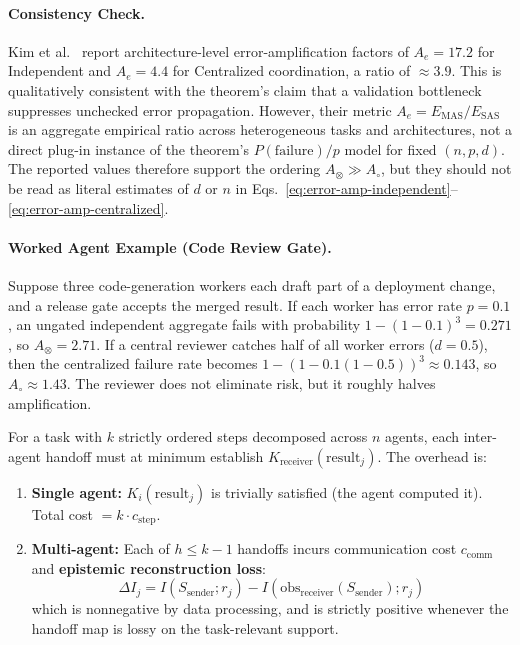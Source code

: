 \paragraph{Consistency Check.} Kim et al.~\cite{kim2025scaling} report architecture-level error-amplification factors of $A_e = 17.2$ for Independent and $A_e = 4.4$ for Centralized coordination, a ratio of $\approx 3.9$. This is qualitatively consistent with the theorem's claim that a validation bottleneck suppresses unchecked error propagation. However, their metric $A_e = E_{\mathrm{MAS}}/E_{\mathrm{SAS}}$ is an aggregate empirical ratio across heterogeneous tasks and architectures, not a direct plug-in instance of the theorem's $P(\mathrm{failure})/p$ model for fixed $(n,p,d)$. The reported values therefore support the ordering $A_{\otimes} \gg A_{\circ}$, but they should not be read as literal estimates of $d$ or $n$ in Eqs.~\eqref{eq:error-amp-independent}--\eqref{eq:error-amp-centralized}.

\paragraph{Worked Agent Example (Code Review Gate).}
Suppose three code-generation workers each draft part of a deployment change, and a release gate accepts the merged result. If each worker has error rate $p=0.1$, an ungated independent aggregate fails with probability $1-(1-0.1)^3 = 0.271$, so $A_{\otimes}=2.71$. If a central reviewer catches half of all worker errors ($d=0.5$), then the centralized failure rate becomes $1-(1-0.1(1-0.5))^3 \approx 0.143$, so $A_{\circ}\approx 1.43$. The reviewer does not eliminate risk, but it roughly halves amplification.

\begin{theorem}
\label{thm:sequential-penalty}
For a task with $k$ strictly ordered steps decomposed across $n$ agents, each inter-agent handoff must at minimum establish $K_{\mathrm{receiver}}(\mathrm{result}_j)$. The overhead is:
\begin{enumerate}[leftmargin=*]
\item[(a)] \textbf{Single agent:} $K_i(\mathrm{result}_j)$ is trivially satisfied (the agent computed it). Total cost $= k \cdot c_{\mathrm{step}}$.
\item[(b)] \textbf{Multi-agent:} Each of $h \le k-1$ handoffs incurs communication cost $c_{\mathrm{comm}}$ and \textbf{epistemic reconstruction loss}:
\begin{equation}
\Delta I_j = I(S_{\mathrm{sender}}; r_j) - I(\mathrm{obs}_{\mathrm{receiver}}(S_{\mathrm{sender}}); r_j)
\label{eq:epistemic-reconstruction-loss}
\end{equation}
which is nonnegative by data processing, and is strictly positive whenever the handoff map is lossy on the task-relevant support.
\end{enumerate}
\end{theorem}

